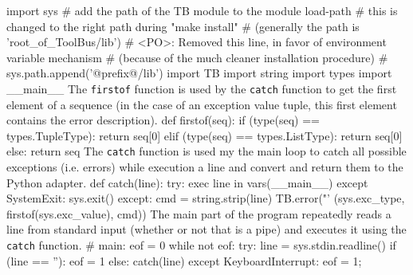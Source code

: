 import sys
# add the path of the TB module to the module load-path
# this is changed to the right path during "make install" 
# (generally the path is 'root_of_ToolBus/lib')
# <PO>: Removed this line, in favor of environment variable mechanism
#       (because of the much cleaner installation procedure)
# sys.path.append('@prefix@/lib')
import TB
import string
import types
import __main__
\nwendcode{}\nwdocspar
The \texttt{firstof} function is used by the \texttt{catch} function
to get the first element of a sequence (in the case of an exception
value tuple, this first element contains the error description).
\nwenddocs{}\plusendmoddef\let\nwnotused=\nwoutput{}\nwstartdeflinemarkup{}\nwenddeflinemarkup
def firstof(seq):
        if (type(seq) == types.TupleType):
                return seq[0]
        elif (type(seq) == types.ListType):
                return seq[0]
        else:
                return seq
\nwendcode{}\nwdocspar
The \texttt{catch} function is used my the main loop to catch all
possible exceptions (i.e. errors) while execution a line and
convert and return them to the Python adapter.
\nwenddocs{}\plusendmoddef\let\nwnotused=\nwoutput{}\nwstartdeflinemarkup{}\nwenddeflinemarkup
def catch(line):
        try:
                exec line in vars(__main__)
        except SystemExit:
                sys.exit()
        except:
                cmd = string.strip(line)
                TB.error("'%
                         (sys.exc_type, firstof(sys.exc_value), cmd))
\nwendcode{}\nwdocspar
The main part of the program repeatedly reads a line from standard
input (whether or not that is a pipe) and executes it using the
\texttt{catch} function.
\nwenddocs{}\plusendmoddef\let\nwnotused=\nwoutput{}\nwstartdeflinemarkup{}\nwenddeflinemarkup
# main:
eof = 0
while not eof:
        try:
                line = sys.stdin.readline()     
                if (line == ''):
                        eof = 1
                else:
                        catch(line)
        except KeyboardInterrupt:
                eof = 1;
\nwendcode{}

%
\nwdocspar

\nwenddocs{}
